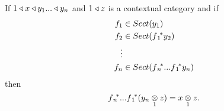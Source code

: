 \begin{lemma}
If $1 \base x \base y_1 ... \base y_n$ and $1 \base z$ is  a contextual category \catcw and if 
\begin{align*}
f_1 &\in Sect(y_1)                \\
f_2 &\in Sect(\fonestar y_2)      \\
\vdots                            \\
f_n &\in Sect(\fnvectorstar y_n)
\end{align*}
then
\begin{equation*}
\fnvectorstar(\crossx{y_n}{z}{1}) = \crossx{x}{z}{1}.
\end{equation*}
\end{lemma}

